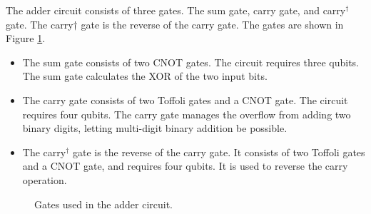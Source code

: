 \documentclass[letterpaper]{article}
\begin{document}
The adder circuit consists of three gates. The sum gate, carry gate, and carry\(^{\dagger}\) gate. The carry\(\dagger\) gate is the reverse of the carry gate. The gates are shown in Figure \ref{fig:adder-gates}.

\begin{itemize}
    \item The sum gate consists of two CNOT gates. The circuit requires three qubits. The sum gate calculates the XOR of the two input bits.
    \item The carry gate consists of two Toffoli gates and a CNOT gate. The circuit requires four qubits. The carry gate manages the overflow from adding two binary digits, letting multi-digit binary addition be possible.
    \item The carry\(^{\dagger}\) gate is the reverse of the carry gate. It consists of two Toffoli gates and a CNOT gate, and requires four qubits. It is used to reverse the carry operation.
\end{itemize}

\begin{figure}[H]%
    \centering%
    \qquad%
    \qquad%
    \caption{Gates used in the adder circuit.}%
    \label{fig:adder-gates}%
\end{figure}
\end{document}
